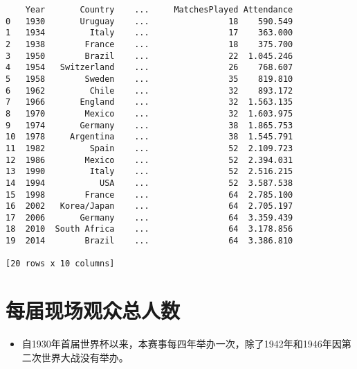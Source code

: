\documentclass[11pt]{article}
\providecommand{\tightlist}{%
      \setlength{\itemsep}{0pt}\setlength{\parskip}{0pt}}
\begin{document}
    
    
    \begin{verbatim}
    Year       Country    ...     MatchesPlayed Attendance
0   1930       Uruguay    ...                18    590.549
1   1934         Italy    ...                17    363.000
2   1938        France    ...                18    375.700
3   1950        Brazil    ...                22  1.045.246
4   1954   Switzerland    ...                26    768.607
5   1958        Sweden    ...                35    819.810
6   1962         Chile    ...                32    893.172
7   1966       England    ...                32  1.563.135
8   1970        Mexico    ...                32  1.603.975
9   1974       Germany    ...                38  1.865.753
10  1978     Argentina    ...                38  1.545.791
11  1982         Spain    ...                52  2.109.723
12  1986        Mexico    ...                52  2.394.031
13  1990         Italy    ...                52  2.516.215
14  1994           USA    ...                52  3.587.538
15  1998        France    ...                64  2.785.100
16  2002   Korea/Japan    ...                64  2.705.197
17  2006       Germany    ...                64  3.359.439
18  2010  South Africa    ...                64  3.178.856
19  2014        Brazil    ...                64  3.386.810

[20 rows x 10 columns]
    \end{verbatim}

    
    \section{每届现场观众总人数}\label{ux6bcfux5c4aux73b0ux573aux89c2ux4f17ux603bux4ebaux6570}

\begin{itemize}
\tightlist
\item
  自1930年首届世界杯以来，本赛事每四年举办一次，除了1942年和1946年因第二次世界大战没有举办。
\end{itemize}
\end{document}
